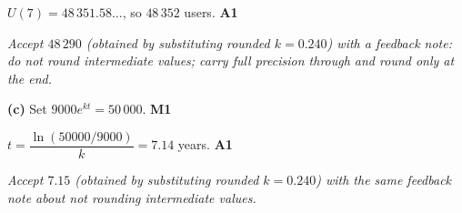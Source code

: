 \documentclass[12pt, twoside]{article}
\begin{document}
\begin{enumerate}[itemsep=0.3cm]
$U(7)=48\,351.58\ldots$, so $48\,352$ users. \hfill \textbf{A1}

\emph{Accept $48\,290$ (obtained by substituting rounded $k=0.240$)
with a feedback note: do not round intermediate values; carry full
precision through and round only at the end.}

\medskip

\textbf{(c)} Set $9000e^{kt}=50\,000$. \hfill \textbf{M1}

$t=\dfrac{\ln(50000/9000)}{k}=7.14$ years. \hfill \textbf{A1}

\emph{Accept $7.15$ (obtained by substituting rounded $k=0.240$) with
the same feedback note about not rounding intermediate values.}

\end{enumerate}
\end{document}
